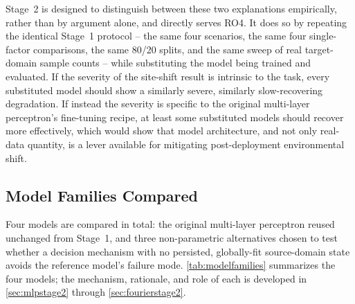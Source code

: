 \documentclass{iutbscthesis}
\begin{document}
Stage~2 is designed to distinguish between these two explanations empirically, rather than by argument alone, and directly serves RO4. It does so by repeating the identical Stage~1 protocol -- the same four scenarios, the same four single-factor comparisons, the same 80/20 splits, and the same sweep of real target-domain sample counts -- while substituting the model being trained and evaluated. If the severity of the site-shift result is intrinsic to the task, every substituted model should show a similarly severe, similarly slow-recovering degradation. If instead the severity is specific to the original multi-layer perceptron's fine-tuning recipe, at least some substituted models should recover more effectively, which would show that model architecture, and not only real-data quantity, is a lever available for mitigating post-deployment environmental shift.

\subsection{Model Families Compared}
\label{sec:modelfamilies}

Four models are compared in total: the original multi-layer perceptron reused unchanged from Stage~1, and three non-parametric alternatives chosen to test whether a decision mechanism with no persisted, globally-fit source-domain state avoids the reference model's failure mode. \autoref{tab:modelfamilies} summarizes the four models; the mechanism, rationale, and role of each is developed in \autoref{sec:mlpstage2} through \autoref{sec:fourierstage2}.
\end{document}
